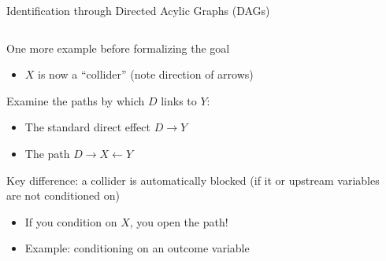 \documentclass[notes,11pt, aspectratio=169]{beamer}
\newenvironment{wideitemize}{\itemize\addtolength{\itemsep}{10pt}}{\enditemize}
\begin{document}
\begin{frame}{Identification through Directed Acylic Graphs (DAGs)}
\begin{columns}[T] %
  \begin{column}{.6\textwidth}
    \begin{wideitemize}
    \item One more example before formalizing the goal
      \begin{itemize}
      \item $X$ is now a ``collider'' (note direction of arrows)
      \end{itemize}
    \item Examine the paths by which $D$ links to $Y$:
      \begin{itemize}
      \item The standard direct effect $D \rightarrow Y$
      \item The path $D \rightarrow X \leftarrow Y$
      \end{itemize}
    \item Key difference: a collider is automatically blocked
      (if it or upstream variables are not conditioned on)
      \begin{itemize}
      \item If you condition on $X$, you open the path!
      \item Example: conditioning on an outcome variable
      \end{itemize}
    \end{wideitemize}
  \end{column}%
  \hfill%
  \begin{column}{.5\textwidth}
    \begin{center}
    \end{center}
  \end{column}
\end{columns}
\end{frame}
\end{document}
